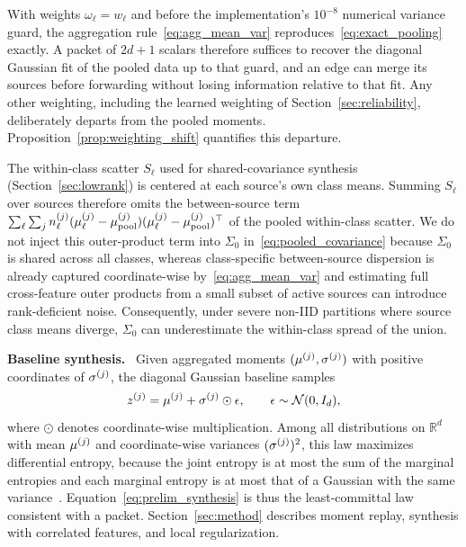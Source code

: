 With weights $\omega_\ell=w_\ell$ and before the implementation's $10^{-8}$ numerical variance guard, the aggregation rule~\eqref{eq:agg_mean_var} reproduces~\eqref{eq:exact_pooling} exactly. A packet of $2d+1$ scalars therefore suffices to recover the diagonal Gaussian fit of the pooled data up to that guard, and an edge can merge its sources before forwarding without losing information relative to that fit. Any other weighting, including the learned weighting of Section~\ref{sec:reliability}, deliberately departs from the pooled moments. Proposition~\ref{prop:weighting_shift} quantifies this departure.

\begin{remark}
\label{rem:scatter_pooling}
The within-class scatter $S_\ell$ used for shared-covariance synthesis (Section~\ref{sec:lowrank}) is centered at each source's own class means. Summing $S_\ell$ over sources therefore omits the between-source term
$\sum_\ell\sum_j n_\ell^{(j)}(\mu_\ell^{(j)}-\mu_{\mathrm{pool}}^{(j)})(\mu_\ell^{(j)}-\mu_{\mathrm{pool}}^{(j)})^\top$
of the pooled within-class scatter. We do not inject this outer-product term into $\Sigma_0$ in~\eqref{eq:pooled_covariance} because $\Sigma_0$ is shared across all classes, whereas class-specific between-source dispersion is already captured coordinate-wise by~\eqref{eq:agg_mean_var} and estimating full cross-feature outer products from a small subset of active sources can introduce rank-deficient noise. Consequently, under severe non-IID partitions where source class means diverge, $\Sigma_0$ can underestimate the within-class spread of the union.
\end{remark}

\noindent\textbf{Baseline synthesis.}~
Given aggregated moments $(\mu^{(j)},\sigma^{(j)})$ with positive coordinates of $\sigma^{(j)}$, the diagonal Gaussian baseline samples
\begin{equation}
 z^{(j)}=\mu^{(j)}+\sigma^{(j)}\odot\epsilon,
 \qquad \epsilon\sim\mathcal N(0,I_d),
 \label{eq:prelim_synthesis}
\end{equation}
where $\odot$ denotes coordinate-wise multiplication. Among all distributions on $\mathbb R^d$ with mean $\mu^{(j)}$ and coordinate-wise variances $(\sigma^{(j)})^2$, this law maximizes differential entropy, because the joint entropy is at most the sum of the marginal entropies and each marginal entropy is at most that of a Gaussian with the same variance~\cite[Sec.~8.6]{cover2006elements}. Equation~\eqref{eq:prelim_synthesis} is thus the least-committal law consistent with a packet. Section~\ref{sec:method} describes moment replay, synthesis with correlated features, and local regularization.


